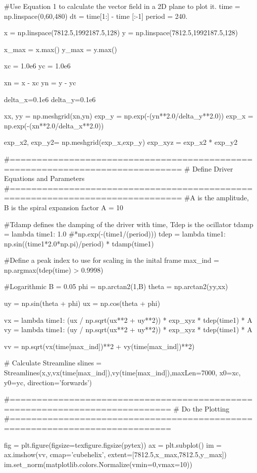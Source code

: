 \begin{pycode}[chapter6]

#Use Equation 1 to calculate the vector field in a 2D plane to plot it.
time = np.linspace(0,60,480)
dt = time[1:] - time [:-1]
period = 240.

x = np.linspace(7812.5,1992187.5,128)
y = np.linspace(7812.5,1992187.5,128)

x_max = x.max()
y_max = y.max()

xc = 1.0e6
yc = 1.0e6

xn = x - xc
yn = y - yc

delta_x=0.1e6
delta_y=0.1e6

xx, yy = np.meshgrid(xn,yn)
exp_y = np.exp(-(yn**2.0/delta_y**2.0))
exp_x = np.exp(-(xn**2.0/delta_x**2.0))

exp_x2, exp_y2= np.meshgrid(exp_x,exp_y)
exp_xyz = exp_x2 * exp_y2


#==============================================================================
# Define Driver Equations and Parameters
#==============================================================================
#A is the amplitude, B is the spiral expansion factor
A = 10

#Tdamp defines the damping of the driver with time, Tdep is the ocillator
tdamp = lambda time1: 1.0 #*np.exp(-(time1/(period)))
tdep = lambda time1: np.sin((time1*2.0*np.pi)/period) * tdamp(time1)

#Define a peak index to use for scaling in the inital frame
max_ind = np.argmax(tdep(time) > 0.9998)

#Logarithmic
B = 0.05
phi = np.arctan2(1,B)
theta = np.arctan2(yy,xx)

uy = np.sin(theta + phi)
ux =  np.cos(theta + phi)

vx = lambda time1: (ux / np.sqrt(ux**2 + uy**2)) * exp_xyz * tdep(time1) * A
vy = lambda time1: (uy / np.sqrt(ux**2 + uy**2)) * exp_xyz * tdep(time1) * A

vv = np.sqrt(vx(time[max_ind])**2 + vy(time[max_ind])**2)

# Calculate Streamline
slines = Streamlines(x,y,vx(time[max_ind]),vy(time[max_ind]),maxLen=7000,
x0=xc, y0=yc, direction='forwards')

#============================================================================
# Do the Plotting
#============================================================================

fig = plt.figure(figsize=texfigure.figsize(pytex))
ax = plt.subplot()
im = ax.imshow(vv, cmap='cubehelix', extent=[7812.5,x_max,7812.5,y_max])
im.set_norm(matplotlib.colors.Normalize(vmin=0,vmax=10))


\end{pycode}
